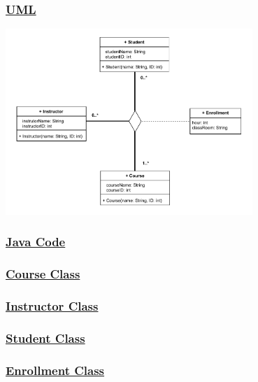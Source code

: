 \subsubsection*{\underline{UML}}

\begin{center}
\includegraphics[width=0.7\textwidth]{Chapters/Diagram/OOP/EX2/ex2.e.drawio.pdf}
\end{center}


\subsubsection*{\underline{Java Code}}

\subsubsection*{\underline{Course Class}}



\newpage
\subsubsection*{\underline{Instructor Class}}


\subsubsection*{\underline{Student Class}}



\subsubsection*{\underline{Enrollment Class}}


